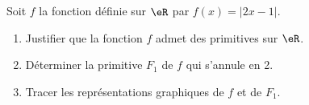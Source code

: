 
\begin{exercice}\label{exoautoanalyseCTU-18}




Soit $f$ la fonction définie sur $\eR$ par $f(x)=|2x-1|$.
\begin{enumerate}
\item Justifier que la fonction $f$ admet des primitives sur $\eR$.
\item Déterminer la primitive $F_{1}$ de $f$ qui s'annule en 2.
\item Tracer les représentations graphiques de $f$ et de $F_{1}$.

\end{enumerate}




\end{exercice}
